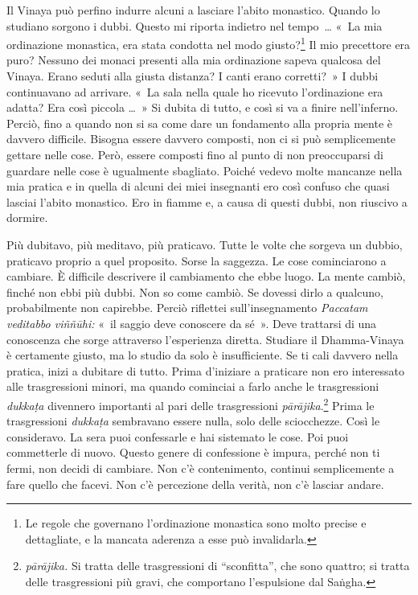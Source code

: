 Il Vinaya può perfino indurre alcuni a lasciare l'abito monastico.
Quando lo studiano sorgono i dubbi. Questo mi riporta indietro nel
tempo~\ldots{} «~La mia ordinazione monastica, era stata condotta nel modo
giusto?\footnote{Le regole che governano l'ordinazione monastica sono
  molto precise e dettagliate, e la mancata aderenza a esse può
  invalidarla.} Il mio precettore era puro? Nessuno dei monaci presenti
alla mia ordinazione sapeva qualcosa del Vinaya. Erano seduti alla
giusta distanza? I canti erano corretti?~» I dubbi continuavano ad
arrivare. «~La sala nella quale ho ricevuto l'ordinazione era adatta?
Era così piccola \ldots{}~» Si dubita di tutto, e così si va a finire
nell'inferno. Perciò, fino a quando non si sa come dare un fondamento
alla propria mente è davvero difficile. Bisogna essere davvero composti,
non ci si può semplicemente gettare nelle cose. Però, essere composti
fino al punto di non preoccuparsi di guardare nelle cose è ugualmente
sbagliato. Poiché vedevo molte mancanze nella mia pratica e in quella di
alcuni dei miei insegnanti ero così confuso che quasi lasciai l'abito
monastico. Ero in fiamme e, a causa di questi dubbi, non riuscivo a
dormire.

Più dubitavo, più meditavo, più praticavo. Tutte le volte che sorgeva un
dubbio, praticavo proprio a quel proposito. Sorse la saggezza. Le cose
cominciarono a cambiare. È difficile descrivere il cambiamento che ebbe
luogo. La mente cambiò, finché non ebbi più dubbi. Non so come cambiò.
Se dovessi dirlo a qualcuno, probabilmente non capirebbe. Perciò
riflettei sull'insegnamento \emph{Paccatam veditabbo viññūhi:} «~il
saggio deve conoscere da sé~». Deve trattarsi di una conoscenza che
sorge attraverso l'esperienza diretta. Studiare il Dhamma-Vinaya è
certamente giusto, ma lo studio da solo è insufficiente. Se ti cali
davvero nella pratica, inizi a dubitare di tutto. Prima d'iniziare a
praticare non ero interessato alle trasgressioni minori, ma quando
cominciai a farlo anche le trasgressioni \emph{dukkaṭa} divennero
importanti al pari delle trasgressioni \emph{pārājika}.\footnote{\emph{pārājika.}
  Si tratta delle trasgressioni di ``sconfitta'', che sono quattro; si
  tratta delle trasgressioni più gravi, che comportano l'espulsione dal
  Saṅgha.} Prima le trasgressioni \emph{dukkaṭa} sembravano essere
nulla, solo delle sciocchezze. Così le consideravo. La sera puoi
confessarle e hai sistemato le cose. Poi puoi commetterle di nuovo.
Questo genere di confessione è impura, perché non ti fermi, non decidi
di cambiare. Non c'è contenimento, continui semplicemente a fare quello
che facevi. Non c'è percezione della verità, non c'è lasciar andare.

